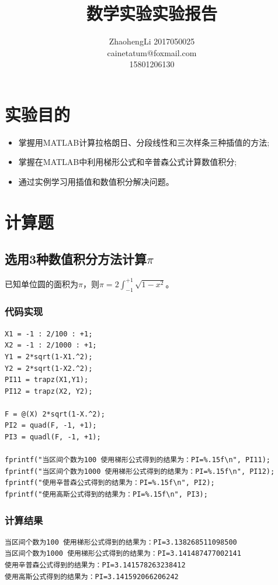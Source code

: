 \documentclass{article}
\title{数学实验实验报告}
\author{ZhaohengLi 2017050025\\cainetatum@foxmail.com\\15801206130}
\begin{document}
\maketitle{}

\section{实验目的}
\begin{itemize}
	\item{掌握用MATLAB计算拉格朗日、分段线性和三次样条三种插值的方法;}
	\item{掌握在MATLAB中利用梯形公式和辛普森公式计算数值积分;}
	\item{通过实例学习用插值和数值积分解决问题。}
\end{itemize}

\section{计算题}

\subsection{选用3种数值积分方法计算$\pi$}
已知单位圆的面积为$\pi$，则$\pi=2\int_{-1}^{+1}\sqrt{1-x^{2}}$。
\subsubsection{代码实现}
\begin{lstlisting}
X1 = -1 : 2/100 : +1;
X2 = -1 : 2/1000 : +1;
Y1 = 2*sqrt(1-X1.^2);
Y2 = 2*sqrt(1-X2.^2);
PI11 = trapz(X1,Y1);
PI12 = trapz(X2, Y2);

F = @(X) 2*sqrt(1-X.^2);
PI2 = quad(F, -1, +1);
PI3 = quadl(F, -1, +1);

fprintf("当区间个数为100 使用梯形公式得到的结果为：PI=%.15f\n", PI11);
fprintf("当区间个数为1000 使用梯形公式得到的结果为：PI=%.15f\n", PI12);
fprintf("使用辛普森公式得到的结果为：PI=%.15f\n", PI2);
fprintf("使用高斯公式得到的结果为：PI=%.15f\n", PI3);
\end{lstlisting}

\subsubsection{计算结果}
\begin{lstlisting}
当区间个数为100 使用梯形公式得到的结果为：PI=3.138268511098500
当区间个数为1000 使用梯形公式得到的结果为：PI=3.141487477002141
使用辛普森公式得到的结果为：PI=3.141578263238412
使用高斯公式得到的结果为：PI=3.141592066206242
\end{lstlisting}
\end{document}
